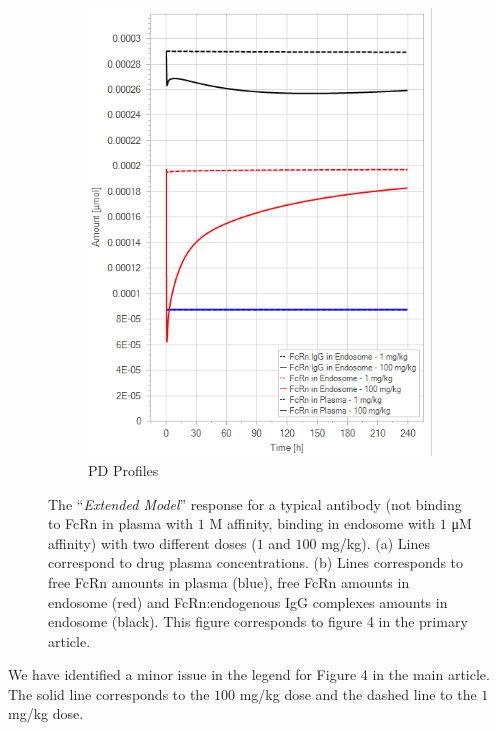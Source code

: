 \documentclass[fleqn,10pt]{physiome}
\begin{document}
\begin{figure}[htb]
\begin{subfigure}{0.49\textwidth}
        \includegraphics[width=\textwidth]{pl5.png}
        \caption{PD Profiles}
        \label{fig:3b}
    \end{subfigure}
    \caption{The ``\textit{Extended Model}'' response for a typical antibody (not binding to FcRn in plasma with $1$ \si{M} affinity, binding in endosome with $1$ \si{\micro M} affinity) with two different doses ($1$ and $100$ mg/kg). (a) Lines correspond to drug plasma concentrations. (b) Lines corresponds to free FcRn amounts in plasma (blue), free FcRn amounts in endosome (red) and FcRn:endogenous IgG complexes amounts in endosome (black). This figure corresponds to figure 4 in the primary article.}
    \label{fig:3}
\end{figure}

We have identified a minor issue in the legend for Figure 4 in the main article. The solid line corresponds to the $100$ mg/kg dose and the dashed line to the $1$ mg/kg dose.
\end{document}
